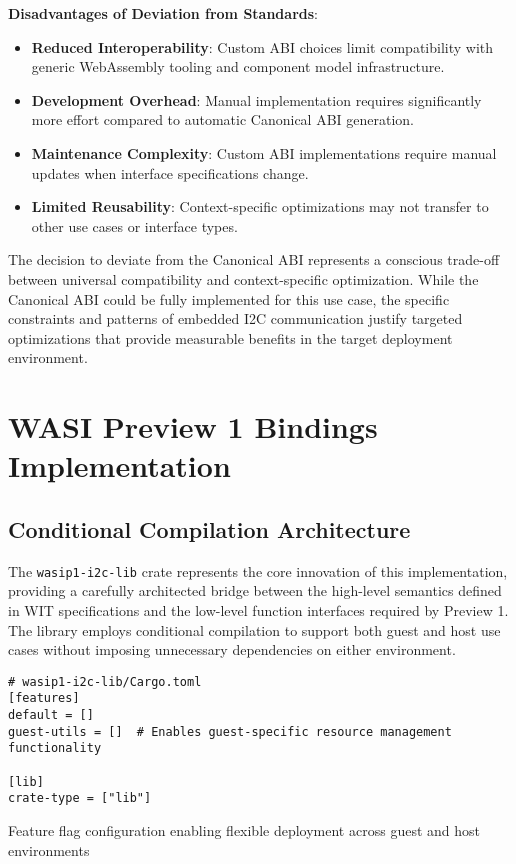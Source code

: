 \textbf{Disadvantages of Deviation from Standards}:
\begin{itemize}
    \item \textbf{Reduced Interoperability}: Custom ABI choices limit compatibility with generic WebAssembly tooling and component model infrastructure.
    \item \textbf{Development Overhead}: Manual implementation requires significantly more effort compared to automatic Canonical ABI generation.
    \item \textbf{Maintenance Complexity}: Custom ABI implementations require manual updates when interface specifications change.
    \item \textbf{Limited Reusability}: Context-specific optimizations may not transfer to other use cases or interface types.
\end{itemize}

The decision to deviate from the Canonical ABI represents a conscious trade-off between universal compatibility and context-specific optimization. While the Canonical ABI could be fully implemented for this use case, the specific constraints and patterns of embedded I2C communication justify targeted optimizations that provide measurable benefits in the target deployment environment.

\section{WASI Preview 1 Bindings Implementation}
\label{sec:wasip1-bindings}

\subsection{Conditional Compilation Architecture}

The \texttt{wasip1-i2c-lib} crate represents the core innovation of this implementation, providing a carefully architected bridge between the high-level semantics defined in WIT specifications and the low-level function interfaces required by Preview 1. The library employs conditional compilation to support both guest and host use cases without imposing unnecessary dependencies on either environment.

\begin{listing}[H]
\begin{verbatim}
# wasip1-i2c-lib/Cargo.toml
[features]
default = []
guest-utils = []  # Enables guest-specific resource management functionality

[lib]
crate-type = ["lib"]
\end{verbatim}
\caption{Feature flag configuration enabling flexible deployment across guest and host environments}
\label{lst:conditional-compilation}
\end{listing}

